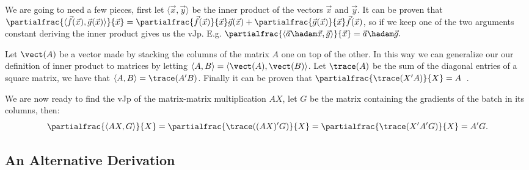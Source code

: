 \documentclass{article}
\begin{document}
We are going to need a few pieces, first let \(\langle\vec x,\vec y\rangle\) be
the inner product of the vectors \(\vec x\) and \(\vec y.\) It can be proven
that \(\partialfrac{\langle\vec f(\vec x),\vec g(\vec x)\rangle}{\vec x}
= \partialfrac{\vec f(\vec x)}{\vec x} \vec g(\vec x)
	+ \partialfrac{\vec g(\vec x)}{\vec x} \vec f(\vec x)\), so if we keep one
of the two arguments constant deriving the inner product gives us the vJp. E.g.
\(\partialfrac{\langle\vec a \hadam \vec x,\vec g\rangle}{\vec x}
= \vec a \hadam \vec g.\)

Let \(\vect(A)\) be a vector made by stacking the columns of the matrix \(A\)
one on top of the other. In this way we can generalize our our definition of
inner product to matrices by letting \(\langle A,B\rangle =
\langle\vect(A),\vect(B)\rangle\). Let \(\trace(A)\) be the sum of the diagonal
entries of a square matrix, we have that \(\langle A,B\rangle = \trace(A'B)\).
Finally it can be proven that \(\partialfrac{\trace(X'A)}{X} =
A\)~\cite{cookbook,magnus}.

We are now ready to find the vJp of the matrix-matrix multiplication \(A X\),
let \(G\) be the matrix containing the gradients of the batch in its columns,
then: \[
\partialfrac{\langle AX,G\rangle}{X}
= \partialfrac{\trace((AX)'G)}{X}
= \partialfrac{\trace(X'A'G)}{X}
= A'G.\]


\subsection{An Alternative Derivation}


\end{document}
